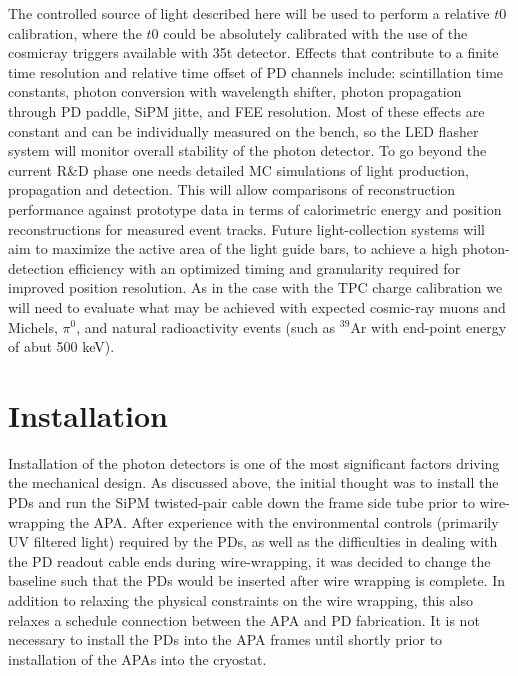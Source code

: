 The controlled source of light described here will be used to perform
a relative $t0$ calibration, where the $t0$ could be absolutely
calibrated with the use of the cosmicray triggers available with
35t detector. Effects that contribute to a finite time resolution
and relative time offset of PD channels include: scintillation time
constants, photon conversion with wavelength shifter, photon
propagation through PD paddle, SiPM jitte, and FEE resolution. Most of
these effects are constant and can be individually measured on the
bench, so the LED flasher system will monitor overall stability of the
photon detector.  To go beyond the current R\&D phase one needs
detailed MC simulations of light production, propagation and
detection. This will allow comparisons of reconstruction performance against
prototype data in terms of calorimetric energy and position
reconstructions for measured event tracks. Future light-collection
systems will aim to maximize the active area of the light guide bars,
to achieve a high photon-detection efficiency with an optimized timing
and granularity required for improved position resolution. As in the
case with the TPC charge calibration we will need to evaluate what may
be achieved with expected cosmic-ray muons and Michels, $\pi^0$, and
natural radioactivity events (such as $^{39}$Ar with end-point energy
of abut 500 keV).

\section{Installation}

Installation of the photon detectors is one of the most significant
factors driving the mechanical design.  As discussed above, the
initial thought was to install the PDs and run the SiPM twisted-pair
cable down the frame side tube prior to wire-wrapping the APA.
After experience with the environmental controls (primarily UV
filtered light) required by the PDs, as well as the difficulties in
dealing with the PD readout cable ends during wire-wrapping, it was
decided to change the baseline \fixme{} %
such that the PDs would be inserted after
wire wrapping is complete.  In addition to relaxing the physical constraints on
the wire wrapping, this also relaxes a schedule connection between the
APA and PD fabrication.  It is not necessary to install the PDs into
the APA frames until shortly prior to installation of the APAs into
the cryostat.

